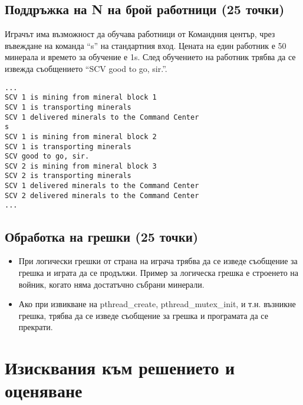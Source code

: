 \documentclass[a4paper,10pt]{article}
\begin{document}
		\subsection{Поддръжка на N на брой работници (25 точки)}
		
			Играчът има възможност да обучава работници от Командния център, чрез въвеждане на команда ``s'' на стандартния вход. Цената на един работник е 50 минерала и времето за обучение е 1s. След обучението на работник трябва да се извежда съобщението ``SCV good to go, sir.''.
			
			\begin{verbatim}
...
SCV 1 is mining from mineral block 1
SCV 1 is transporting minerals 
SCV 1 delivered minerals to the Command Center
s
SCV 1 is mining from mineral block 2
SCV 1 is transporting minerals
SCV good to go, sir.
SCV 2 is mining from mineral block 3
SCV 2 is transporting minerals
SCV 1 delivered minerals to the Command Center
SCV 2 delivered minerals to the Command Center
...
\end{verbatim}
		\subsection{Обработка на грешки (25 точки)}
		\begin{itemize}
			\item При логически грешки от страна на играча трябва да се изведе съобщение за грешка и играта да се продължи. Пример за логическа грешка е строенето на войник, когато няма достатъчно събрани минерали.
			\item Ако при извикване на pthread\_create, pthread\_mutex\_init, и т.н. възникне грешка, трябва да се изведе съобщение за грешка и програмата да се прекрати.
		\end{itemize}

	\section{Изисквания към решението и оценяване}
	
\end{document}
